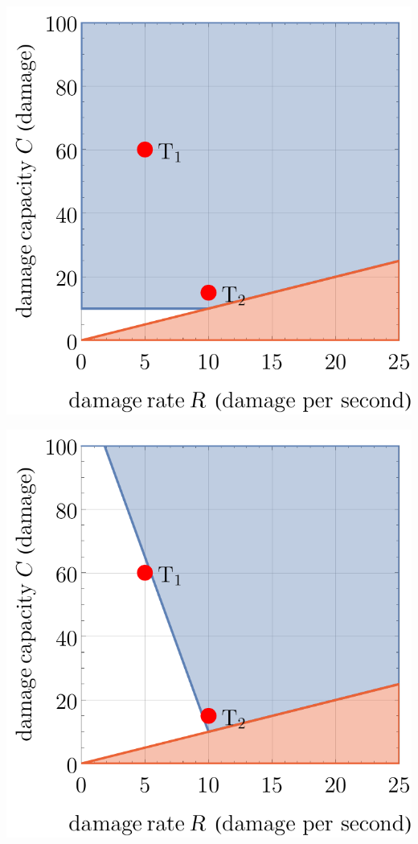 \begin{center}
\begin{minipage}{.33\textwidth}
        \label{fig:model-3-g0.5}
    \end{minipage}
    \begin{minipage}{.33\textwidth}
        \centering
        \includegraphics[width=0.95\linewidth]{img/model3 n1.pdf}
        \label{fig:model-3-n1}
    \end{minipage}%
    \begin{minipage}{.33\textwidth}
        \centering
        \includegraphics[width=0.95\linewidth]{img/model3 n12.pdf}

\end{minipage}
\end{center}

